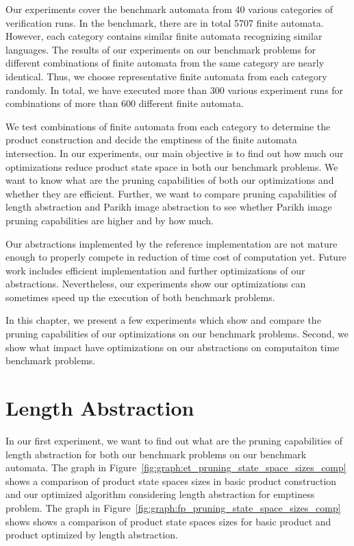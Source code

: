 Our experiments cover the benchmark automata from 40 various categories of verification runs. In the benchmark, there are in total 5707 finite automata. However, each category contains similar finite automata recognizing similar languages. The results of our experiments on our benchmark problems for different combinations of finite automata from the same category are nearly identical. Thus, we choose representative finite automata from each category randomly. In total, we have executed more than 300 various experiment runs for combinations of more than 600 different finite automata.

We test combinations of finite automata from each category to determine the product construction and decide the emptiness of the finite automata intersection. In our experiments, our main objective is to find out how much our optimizations reduce product state space in both our benchmark problems. We want to know what are the pruning capabilities of both our optimizations and whether they are efficient. Further, we want to compare pruning capabilities of length abstraction and Parikh image abstraction to see whether Parikh image pruning capabilities are higher and by how much.

Our abstractions implemented by the reference implementation are not mature enough to properly compete in reduction of time cost of computation yet. Future work includes efficient implementation and further optimizations of our abstractions. Nevertheless, our experiments show our optimizations can sometimes speed up the execution of both benchmark problems.

In this chapter, we present a few experiments which show and compare the pruning capabilities of our optimizations on our benchmark problems. Second, we show what impact have optimizations on our abstractions on computaiton time benchmark problems.

\section{Length Abstraction}

In our first experiment, we want to find out what are the pruning capabilities of length abstraction for both our benchmark problems on our benchmark automata. The graph in Figure~\ref{fig:graph:et_pruning_state_space_sizes_comp} shows a comparison of product state spaces sizes in basic product construction and our optimized algorithm considering length abstraction for emptiness problem. The graph in Figure~\ref{fig:graph:fp_pruning_state_space_sizes_comp} shows shows a comparison of product state spaces sizes for basic product and product optimized by length abstraction.

